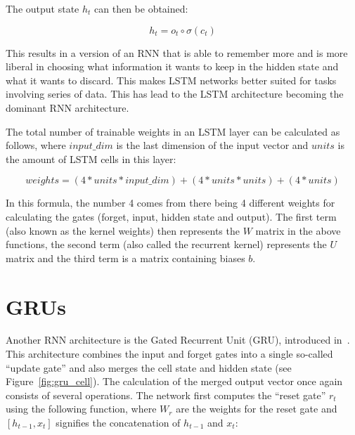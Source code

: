 The output state \(h_t\) can then be obtained:

\begin{equation} \label{eq:hidden_output_gate_lstm}
h_t = o_t \circ \sigma(c_t)
\end{equation}

This results in a version of an RNN that is able to remember more and is more liberal in choosing what information it wants to keep in the hidden state and what it wants to discard. This makes LSTM networks better suited for tasks involving series of data. This has lead to the LSTM architecture becoming the dominant RNN architecture. 

The total number of trainable weights in an LSTM layer can be calculated as follows, where \(input\_dim \) is the last dimension of the input vector and \(units\) is the amount of LSTM cells in this layer:

\begin{equation} \label{eq:lstm_weights}
weights = (4 * units * input\_dim ) + (4 * units * units) + (4 * units)
\end{equation}

In this formula, the number 4 comes from there being 4 different weights for calculating the gates (forget, input, hidden state and output). The first term (also known as the kernel weights) then represents the \(W\) matrix in the above functions, the second term (also called the recurrent kernel) represents the \(U\) matrix and the third term is a matrix containing biases \(b\).

\section{GRUs}
Another RNN architecture is the Gated Recurrent Unit (GRU), introduced in~\cite{cho2014learning}. This architecture combines the input and forget gates into a single so-called \enquote{update gate} and also merges the cell state and hidden state (see Figure~\ref{fig:gru_cell}). The calculation of the merged output vector once again consists of several operations. The network first computes the \enquote{reset gate} \(r_t\) using the following function, where \(W_r\) are the weights for the reset gate and \([h_{t-1}, x_t]\) signifies the concatenation of \(h_{t-1}\) and \(x_t\):

